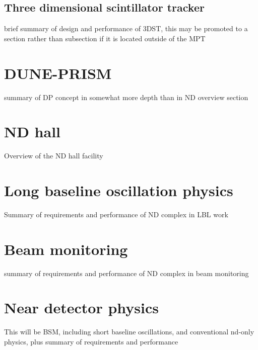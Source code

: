 \subsection{Three dimensional scintillator tracker}
\label{ssec:exsum-nd-mpt-3DST}
brief summary of design and performance of 3DST, this may be promoted to a section rather than subsection if it is located outside of the MPT

\section{DUNE-PRISM}
\label{sec:exsum-nd-DP}
%

summary of DP concept in somewhat more depth than in ND overview section

\section{ND hall}
\label{sec:exsum-nd-hall}
%

Overview of the ND hall facility

\section{Long baseline oscillation physics}
\label{sec:exsum-nd-role-lbl}

Summary of requirements and performance of ND complex in LBL work

\section{Beam monitoring}
\label{sec:exsum-nd-role-bm}

summary of requirements and performance of ND complex in beam monitoring

\section{Near detector physics}
\label{sec:exsum-nd-role-ndphysics}

This will be BSM, including short baseline oscillations, and conventional nd-only physics, plus summary of requirements and performance

